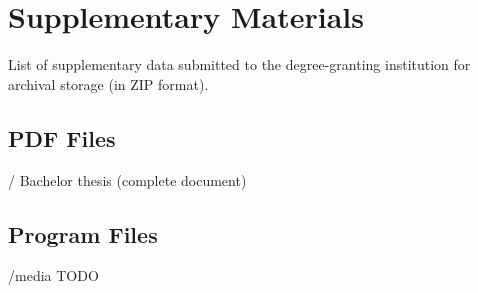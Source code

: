 \chapter{Supplementary Materials}
\label{app:Supplement}


List of supplementary data submitted to the degree-granting institution for archival storage
(in ZIP format).


\section{PDF Files}
\begin{FileList}{/}
 Bachelor thesis (complete document)
\end{FileList}

\section{Program Files}
\begin{FileList}{/media}
 TODO
\end{FileList}





